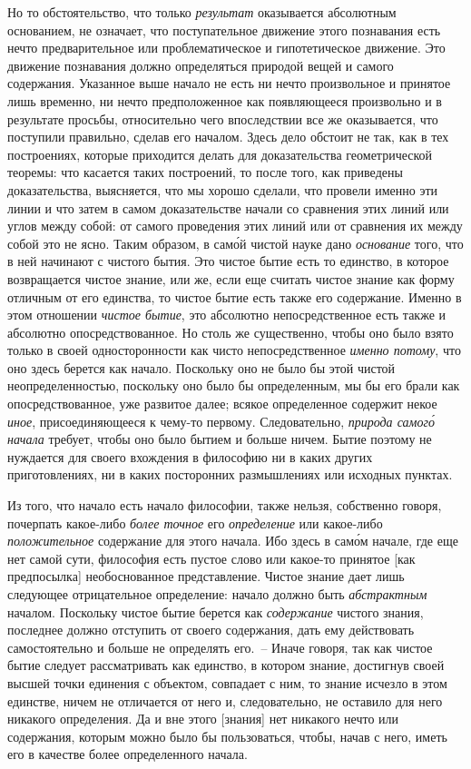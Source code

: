 Но то обстоятельство, что только \emph{результат} оказывается
абсолютным основанием, не означает, что поступательное
движение этого познавания есть нечто предварительное
или проблематическое и гипотетическое движение.
Это движение познавания должно определяться
природой вещей и самого содержания. Указанное выше
начало не есть ни нечто произвольное и принятое лишь
временно, ни нечто предположенное как появляющееся
произвольно и в результате просьбы, относительно чего
впоследствии все же оказывается, что поступили правильно,
сделав его началом. Здесь дело обстоит не так,
как в тех построениях, которые приходится делать для
доказательства геометрической теоремы: что касается таких
построений, то после того, как приведены доказательства,
выясняется, что мы хорошо сделали, что провели
именно эти линии и что затем в самом доказательстве
начали со сравнения этих линий или углов между
собой: от самого проведения этих линий или от сравнения
их между собой это не ясно. Таким образом, в сам\'ой
чистой науке дано \emph{основание} того, что в ней начинают
с чистого бытия. Это чистое бытие есть то единство,
в которое возвращается чистое знание, или же, если еще
считать чистое знание как форму отличным от его единства,
то чистое бытие есть также его содержание. Именно
в этом отношении \emph{чистое бытие}, это абсолютно непосредственное
есть также и абсолютно опосредствованное. Но
столь же существенно, чтобы оно было взято только
в своей односторонности как чисто непосредственное
\emph{именно потому}, что оно здесь берется как начало. Поскольку
оно не было бы этой чистой неопределенностью,
поскольку оно было бы определенным, мы бы его брали
как опосредствованное, уже развитое далее; всякое определенное
содержит некое \emph{иное}, присоединяющееся к чему-то
первому. Следовательно, \emph{природа самог\'о начала} требует,
чтобы оно было бытием и больше ничем. Бытие
поэтому не нуждается для своего вхождения в философию
ни в каких других приготовлениях, ни в каких посторонних
размышлениях или исходных пунктах.

Из того, что начало есть начало философии, также
нельзя, собственно говоря, почерпать какое-либо \emph{более
точное} его \emph{определение} или какое-либо \emph{положительное}
содержание для этого начала. Ибо здесь в сам\'ом начале,
где еще нет самой сути, философия есть пустое слово или
какое-то принятое [как предпосылка] необоснованное
представление. Чистое знание дает лишь следующее отрицательное
определение: начало должно быть \emph{абстрактным}
началом. Поскольку чистое бытие берется как \emph{содержание}
чистого знания, последнее должно отступить
от своего содержания, дать ему действовать самостоятельно
и больше не определять его.~-- Иначе говоря, так как
чистое бытие следует рассматривать как единство, в котором
знание, достигнув своей высшей точки единения
с объектом, совпадает с ним, то знание исчезло в этом
единстве, ничем не отличается от него и, следовательно,
не оставило для него никакого определения. Да и вне
этого [знания] нет никакого нечто или содержания, которым
можно было бы пользоваться, чтобы, начав с него,
иметь его в качестве более определенного начала.

